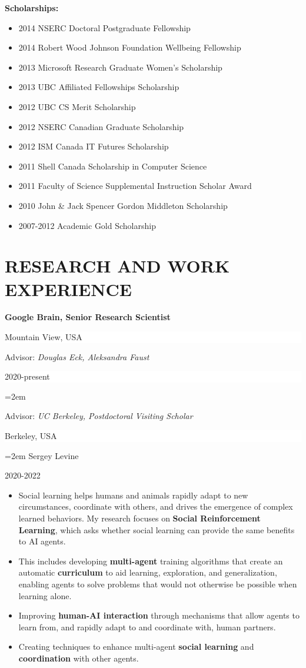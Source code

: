 \documentclass[paper=letter,fontsize=11pt]{scrartcl} %
\newcommand{\sepspace}{\vspace*{1em}}       %
\newcommand{\NewPart}[2]{\section*{\uppercase{#1} #2}}
\newcommand{\ResearchEntry}[5]{
        \noindent \textbf{#1} \hfill      %
        \colorbox{White}{%
            \parbox{10em}{%
            \hfill\color{Black}#2}} \par  %
        \noindent Advisor: \textit{#3} \hfill      %
        \colorbox{White}{%
            \parbox{6em}{%
            \hfill\color{Black}#4}} \par  %
        \noindent\hangindent=2em\hangafter=0 \small #5 %
        \normalsize \par}
\begin{document}
\noindent \textbf{Scholarships:}
\begin{itemize}
\item 2014 NSERC Doctoral Postgraduate Fellowship
\item 2014 Robert Wood Johnson Foundation Wellbeing Fellowship
\item 2013 Microsoft Research Graduate Women's Scholarship
\item 2013 UBC Affiliated Fellowships Scholarship
\item 2012 UBC CS Merit Scholarship
\item 2012 NSERC Canadian Graduate Scholarship
\item 2012 ISM Canada IT Futures Scholarship
\item 2011 Shell Canada Scholarship in Computer Science
\item 2011 Faculty of Science Supplemental Instruction Scholar Award
\item 2010 John \& Jack Spencer Gordon Middleton Scholarship
\item 2007-2012 Academic Gold Scholarship
\end{itemize}

\NewPart{Research and Work Experience}{}
\ResearchEntry{Google Brain, Senior Research Scientist}{Mountain View, USA}{Douglas Eck, Aleksandra Faust}{2020-present}%

\ResearchEntry{UC Berkeley, Postdoctoral Visiting Scholar}{Berkeley, USA}{Sergey Levine}{2020-2022}%
{\begin{itemize}
    \item Social learning helps humans and animals rapidly adapt to new circumstances, coordinate with others, and drives the emergence of complex learned behaviors. My research focuses on \textbf{Social Reinforcement Learning}, which asks whether social learning can provide the same benefits to AI agents. 
    \item This includes developing \textbf{multi-agent} training algorithms that create an automatic \textbf{curriculum} to aid learning, exploration, and generalization, enabling agents to solve problems that would not otherwise be possible when learning alone.
    \item Improving \textbf{human-AI interaction} through mechanisms that allow agents to learn from, and rapidly adapt to and coordinate with, human partners. 
    \item Creating techniques to enhance multi-agent \textbf{social learning} and \textbf{coordination} with other agents.
\end{itemize}}
\sepspace
\end{document}
